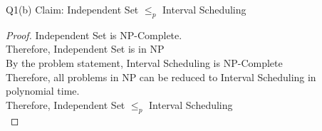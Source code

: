\begin{problem}
    {Q1(b)}
    Claim: Independent Set $\leq_p$ Interval Scheduling \\
    \begin{proof}
        Independent Set is NP-Complete. \\
        Therefore, Independent Set is in NP \\
        By the problem statement, Interval Scheduling is NP-Complete \\
        Therefore, all problems in NP can be reduced to Interval Scheduling in polynomial time. \\
        Therefore, Independent Set $\leq_p$ Interval Scheduling \\
    \end{proof}
\end{problem}
